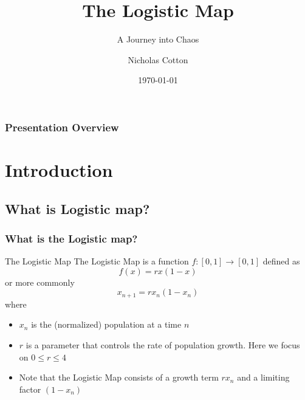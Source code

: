 \documentclass[
	11pt, %
]{beamer}
\title[Logistic Map]{The Logistic Map}
\subtitle{A Journey into Chaos}
\author[Cotton]{Nicholas Cotton} %
\date[\today]{\today} %
\begin{document}
\begin{frame}
	\titlepage %
\end{frame}
\begin{frame}
	\frametitle{Presentation Overview} %
	
	\tableofcontents %
\end{frame}
\section{Introduction} %
\subsection{What is Logistic map?}

\begin{frame}
	\frametitle{What is the Logistic map?}
 \begin{block}{The Logistic Map}
     The Logistic Map is a function $f:[0,1]\to[0,1]$ defined  as
     \[f(x)=rx(1-x)\]
     or more commonly
     \[x_{n+1}=rx_n(1-x_n)\]
     where
     \begin{itemize}
         \item $x_n$ is the (normalized) population at a time $n$
         \item $r$ is a parameter that controls the rate of population growth. Here we focus on $0\leq r\leq 4$
     \end{itemize}
 \end{block}
 
 \begin{itemize}
 
     \item 
     	Note that the Logistic Map consists of a growth term $rx_n$ and a limiting factor $(1-x_n)$
      
 \end{itemize}

 

\end{frame}
\end{document}
